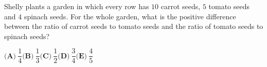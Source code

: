 Shelly plants a garden in which every row has $10$ carrot seeds, $5$ tomato seeds and $4$ spinach seeds. For the whole garden, what is the positive difference between the ratio of carrot seeds to tomato seeds and the ratio of tomato seeds to spinach seeds?

$\textbf{(A)}\ \dfrac14$\qquad$\textbf{(B)}\ \dfrac13$\qquad$\textbf{(C)}\ \dfrac12$\qquad$\textbf{(D)}\ \dfrac34$\qquad$\textbf{(E)}\ \dfrac45$
